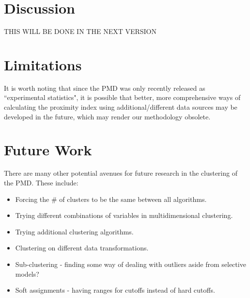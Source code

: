 \documentclass[11pt, a4paper]{article}
\begin{document}
\pagebreak 
\section{Discussion}




THIS WILL BE DONE IN THE NEXT VERSION  
















\pagebreak 
\section{Limitations}


It is worth noting that since the PMD was only recently released as ``experimental statistics", it is possible that better, more comprehensive ways of calculating the proximity index using additional/different data sources may be developed in the future, which may render our methodology obsolete. 










\section{Future Work}



There are many other potential avenues for future research in the clustering of the PMD. These include:
\begin{itemize}
\item Forcing the \# of clusters to be the same between all algorithms. 
\item Trying different combinations of variables in multidimensional clustering.
\item Trying additional clustering algorithms. 
\item Clustering on different data transformations. 
\item Sub-clustering - finding some way of dealing with outliers aside from selective models?
\item Soft assignments - having ranges for cutoffs instead of hard cutoffs. 
\end{itemize}
\end{document}
